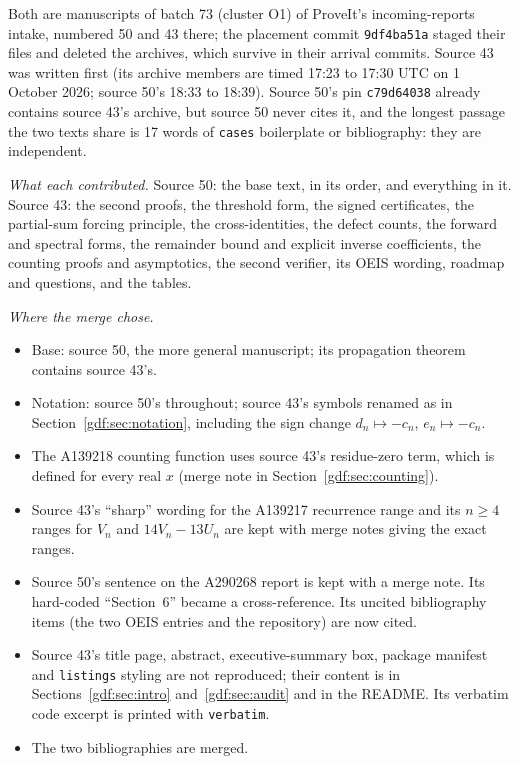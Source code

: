 \documentclass[11pt,a4paper]{article}
\numberwithin{equation}{section}
\theoremstyle{definition}
\theoremstyle{remark}
\theoremstyle{plain}
\begin{document}
Both are manuscripts of batch 73 (cluster O1) of ProveIt's incoming-reports
intake, numbered 50 and 43 there; the placement commit \texttt{9df4ba51a}
staged their files and deleted the archives, which survive in their arrival
commits.  Source 43 was written first (its archive members are timed 17:23 to
17:30 UTC on 1 October 2026; source 50's 18:33 to 18:39).  Source 50's pin
\texttt{c79d64038} already contains source 43's archive, but source 50 never
cites it, and the longest passage the two texts share is 17 words of
\verb|cases| boilerplate or bibliography: they are independent.

\emph{What each contributed.}  Source 50: the base text, in its order, and
everything in it.  Source 43: the second proofs, the threshold form, the
signed certificates, the partial-sum forcing principle, the cross-identities,
the defect counts, the forward and spectral forms, the remainder bound and
explicit inverse coefficients, the counting proofs and asymptotics, the
second verifier, its OEIS wording, roadmap and questions, and the tables.

\emph{Where the merge chose.}
\begin{itemize}
\item Base: source 50, the more general manuscript; its propagation theorem
      contains source 43's.
\item Notation: source 50's throughout; source 43's symbols renamed as in
      Section~\ref{gdf:sec:notation}, including the sign change $d_n\mapsto
      -c_n$, $e_n\mapsto-c_n$.
\item The A139218 counting function uses source 43's residue-zero term, which
      is defined for every real $x$ (merge note in
      Section~\ref{gdf:sec:counting}).
\item Source 43's ``sharp'' wording for the A139217 recurrence range and its
      $n\ge4$ ranges for $V_n$ and $14V_n-13U_n$ are kept with merge notes
      giving the exact ranges.
\item Source 50's sentence on the A290268 report is kept with a merge note.
      Its hard-coded ``Section~6'' became a cross-reference.  Its uncited
      bibliography items (the two OEIS entries and the repository) are now
      cited.
\item Source 43's title page, abstract, executive-summary box, package
      manifest and \verb|listings| styling are not reproduced; their content
      is in Sections~\ref{gdf:sec:intro} and~\ref{gdf:sec:audit} and in the
      README.  Its verbatim code excerpt is printed with \verb|verbatim|.
\item The two bibliographies are merged.
\end{itemize}
\end{document}

